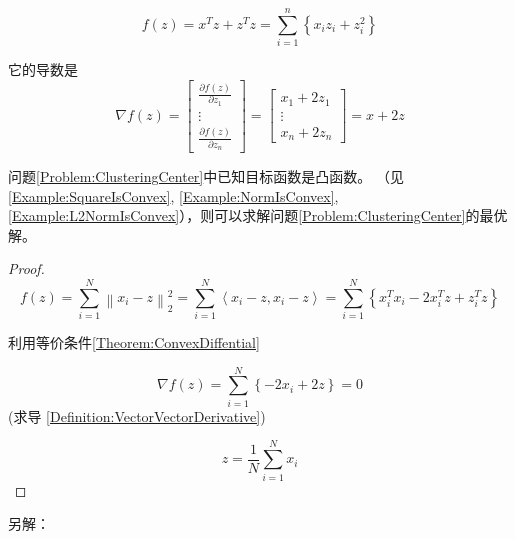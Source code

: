 \begin{example}
    \begin{equation} f(z)=x^{T} z+z^{T} z=\sum_{i=1}^{n}\left\{x_{i} z_{i}+z_{i}^{2}\right\} \end{equation}

    它的导数是
    \begin{equation} \nabla f(z)=\left[\begin{array}{c}\frac{\partial f(z)}{\partial z_{1}} \\ \vdots \\ \frac{\partial f(z)}{\partial z_{n}}\end{array}\right]=\left[\begin{array}{c}x_{1}+2 z_{1} \\ \vdots \\ x_{n}+2 z_{n}\end{array}\right]=x+2 z \end{equation}
\end{example}


问题\ref{Problem:ClusteringCenter}中已知目标函数是凸函数。 （见\ref{Example:SquareIsConvex}, \ref{Example:NormIsConvex}, \ref{Example:L2NormIsConvex}），则可以求解问题\ref{Problem:ClusteringCenter}的最优解。

\begin{proof}
    

\begin{equation} f(z)=\sum_{i=1}^{N}\left\|x_{i}-z\right\|_{2}^{2}=\sum_{i=1}^{N}\left\langle x_{i}-z, x_{i}-z\right\rangle=\sum_{i=1}^{N}\left\{x_{i}^{T} x_{i}-2 x_{i}^{T} z+z_{i}^{T} z\right\} \end{equation}

利用等价条件\ref{Theorem:ConvexDiffential}

\begin{equation} \nabla f(z)=\sum_{i=1}^{N}\left\{-2 x_{i}+2 z\right\}=0 \end{equation} (求导 \ref{Definition:VectorVectorDerivative})

\begin{equation} z=\frac{1}{N} \sum_{i=1}^{N} x_{i} \end{equation}
\end{proof}

另解：

